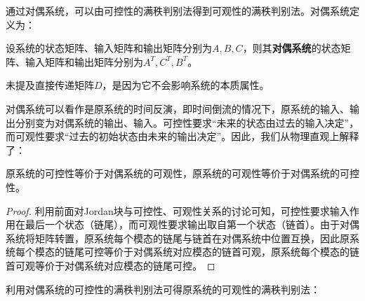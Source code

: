 通过对偶系统，可以由可控性的满秩判别法得到可观性的满秩判别法。对偶系统定义为：
\begin{definition}[对偶系统]
    设系统的状态矩阵、输入矩阵和输出矩阵分别为$A,B,C$，则其\textbf{对偶系统}的状态矩阵、输入矩阵和输出矩阵分别为$A^T,C^T,B^T$。
\end{definition}

未提及直接传递矩阵$D$，是因为它不会影响系统的本质属性。

对偶系统可以看作是原系统的时间反演，即时间倒流的情况下，原系统的输入、输出分别变为对偶系统的输出、输入。可控性要求“未来的状态由过去的输入决定”，而可观性要求“过去的初始状态由未来的输出决定”。因此，我们从物理直观上解释了：

\begin{theorem}
    原系统的可控性等价于对偶系统的可观性，原系统的可观性等价于对偶系统的可控性。
\end{theorem}
\begin{proof}
    利用前面对Jordan块与可控性、可观性关系的讨论可知，可控性要求输入作用在最后一个状态（链尾），而可观性要求输出取自第一个状态（链首）。由于对偶系统将矩阵转置，原系统每个模态的链尾与链首在对偶系统中位置互换，因此原系统每个模态的链尾可控等价于对偶系统对应模态的链首可观，原系统每个模态的链首可观等价于对偶系统对应模态的链尾可控。
\end{proof}

利用对偶系统的可控性的满秩判别法可得原系统的可观性的满秩判别法：

